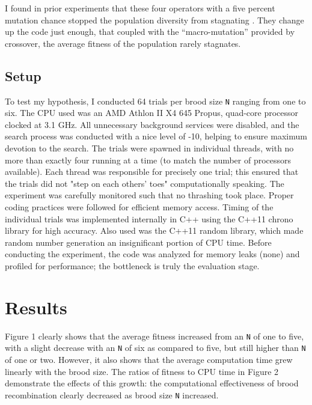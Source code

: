 \documentclass{acm_proc_article-sp}
\begin{document}
I found in prior experiments that these four operators with a five
percent mutation chance stopped the population diversity from
stagnating \cite{Schwartzmeyer:3}. They change up the code just
enough, that coupled with the ``macro-mutation'' provided by
crossover, the average fitness of the population rarely stagnates.

\subsection{Setup}
To test my hypothesis, I conducted 64 trials per brood size \texttt{N}
ranging from one to six. The CPU used was an AMD Athlon II X4 645
Propus, quad-core processor clocked at 3.1 GHz. All unnecessary
background services were disabled, and the search process was
conducted with a nice level of -10, helping to ensure maximum devotion
to the search. The trials were spawned in individual threads, with no
more than exactly four running at a time (to match the number of
processors available). Each thread was responsible for precisely one
trial; this ensured that the trials did not "step on each others'
toes" computationally speaking. The experiment was carefully monitored
such that no thrashing took place. Proper coding practices were
followed for efficient memory access. Timing of the individual trials
was implemented internally in C++ using the C++11 chrono library for
high accuracy. Also used was the C++11 random library, which made
random number generation an insignificant portion of CPU time.  Before
conducting the experiment, the code was analyzed for memory leaks
(none) and profiled for performance; the bottleneck is truly the
evaluation stage.

\section{Results}
Figure 1 clearly shows that the average fitness increased from an \texttt{N}
of one to five, with a slight decrease with an \texttt{N} of six as compared
to five, but still higher than \texttt{N} of one or two. However, it also
shows that the average computation time grew linearly with the brood
size. The ratios of fitness to CPU time in Figure 2 demonstrate the
effects of this growth: the computational effectiveness of brood
recombination clearly decreased as brood size \texttt{N} increased.
\end{document}
